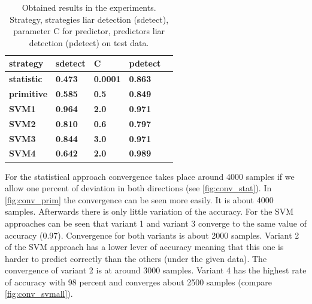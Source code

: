 \documentclass[11pt]{article}
\begin{document}
\begin{table}[H]
\centering
\small
\begin{tabular}{|l|l|l|l|l|}
\hline
\textbf{strategy}&\textbf{sdetect}&\textbf{C}&\textbf{pdetect} \\ \hline
\textbf{statistic}&\textbf{0.473}&\textbf{0.0001}&\textbf{0.863} \\ \hline
\textbf{primitive}&\textbf{0.585}&\textbf{0.5}&\textbf{0.849} \\ \hline
\textbf{SVM1}&\textbf{0.964}&\textbf{2.0}&\textbf{0.971} \\ \hline
\textbf{SVM2}&\textbf{0.810}&\textbf{0.6}&\textbf{0.797}\\ \hline 
\textbf{SVM3}&\textbf{0.844}&\textbf{3.0}&\textbf{0.971}\\ \hline 
\textbf{SVM4}&\textbf{0.642}&\textbf{2.0}&\textbf{0.989} \\ \hline
\end{tabular}
\caption{Obtained results in the experiments. Strategy, strategies liar detection (sdetect), parameter C for predictor, predictors liar detection (pdetect) on test data.}
\label{tab:results}
\end{table}

For the statistical approach convergence takes place around 4000 samples if we allow one percent of deviation in both directions (see \cref{fig:conv_stat}). 
In \cref{fig:conv_prim} the convergence can be seen more easily. It is about 4000 samples. Afterwards there is only little variation of the accuracy. 
For the SVM approaches can be seen that variant 1 and variant 3 converge to the same value of accuracy (0.97). Convergence for both variants is about 2000 samples. Variant 2 of the SVM approach has a lower lever of accuracy meaning that this one is harder to predict correctly than the others (under the given data). The convergence of variant 2 is at around 3000 samples. Variant 4 has the highest rate of accuracy with 98 percent and converges about 2500 samples (compare \cref{fig:conv_svmall}).
\end{document}
